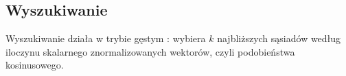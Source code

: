 \subsection{Wyszukiwanie}
\label{sec:wyszukiwanie}
Wyszukiwanie działa w trybie gęstym \cite{manning2008introduction}: wybiera $k$ najbliższych
sąsiadów według iloczynu skalarnego znormalizowanych wektorów, czyli podobieństwa kosinusowego.

%
%
%
%
